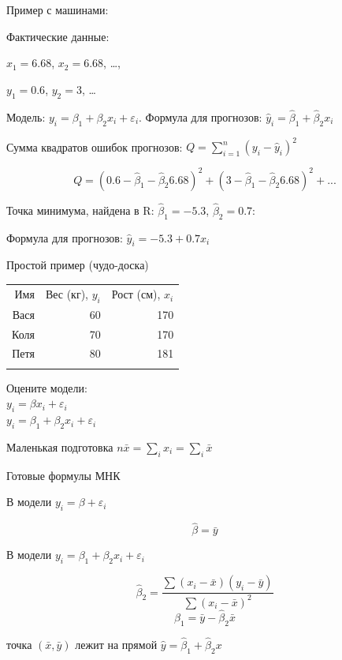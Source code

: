 \documentclass[ignorenonframetext,]{beamer}
\begin{document}
\begin{frame}{Пример с машинами:}

Фактические данные:

$x_1=6.68$, $x_2=6.68$, \ldots{},

$y_1=0.6$, $y_2=3$, \ldots{}

Модель: $y_i=\beta_1+\beta_2 x_i+\varepsilon_i$. Формула для прогнозов:
$\hat{y}_i=\hat{\beta}_1 + \hat{\beta}_2 x_i$

Сумма квадратов ошибок прогнозов: $Q=\sum_{i=1}^n (y_i-\hat{y}_i)^2$

\[
Q=(0.6-\hat{\beta}_1-\hat{\beta}_2 6.68)^2+(3-\hat{\beta}_1-\hat{\beta}_2 6.68)^2+...
\]

Точка минимума, найдена в R: $\hat{\beta}_1=-5.3$, $\hat{\beta}_2=0.7$:

Формула для прогнозов: $\hat{y}_i=-5.3 + 0.7 x_i$

\end{frame}

\begin{frame}{Простой пример (чудо-доска)}

\begin{longtable}[c]{@{}rrr@{}}
\toprule\addlinespace
Имя & Вес (кг), $y_i$ & Рост (см), $x_i$
\\\addlinespace
\midrule\endhead
Вася & 60 & 170
\\\addlinespace
Коля & 70 & 170
\\\addlinespace
Петя & 80 & 181
\\\addlinespace
\bottomrule
\end{longtable}

Оцените
модели:\\$y_i=\beta x_i +\varepsilon_i$\\$y_i=\beta_1+\beta_2 x_i +\varepsilon_i$

Маленькая подготовка $n\bar{x}=\sum_i x_i=\sum_i \bar{x}$

\end{frame}

\begin{frame}{Готовые формулы МНК}

В модели $y_i=\beta +\varepsilon_i$

\[
\hat{\beta}=\bar{y}
\]

В модели $y_i=\beta_1+\beta_2 x_i +\varepsilon_i$

\[
\hat{\beta}_2=\frac{\sum (x_i-\bar{x})(y_i-\bar{y})}{\sum (x_i-\bar{x})^2}
\] \[
\hat{\beta}_1=\bar{y}-\hat{\beta}_2\bar{x}
\]

точка $(\bar{x},\bar{y})$ лежит на прямой
$\hat{y}=\hat{\beta}_1+\hat{\beta}_2 x$

\end{frame}
\end{document}
